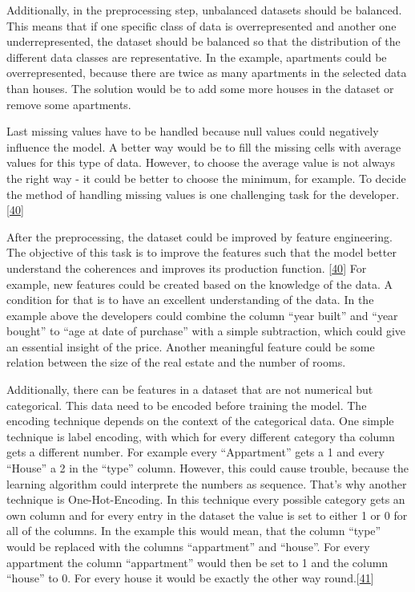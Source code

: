 \documentclass[12pt,english,a4paper,oneside,,tablecaptionabove]{scrbook}
\begin{document}
Additionally, in the preprocessing step, unbalanced datasets should be
balanced. This means that if one specific class of data is
overrepresented and another one underrepresented, the dataset should be
balanced so that the distribution of the different data classes are
representative. In the example, apartments could be overrepresented,
because there are twice as many apartments in the selected data than
houses. The solution would be to add some more houses in the dataset or
remove some apartments.

Last missing values have to be handled because null values could
negatively influence the model. A better way would be to fill the
missing cells with average values for this type of data. However, to
choose the average value is not always the right way - it could be
better to choose the minimum, for example. To decide the method of
handling missing values is one challenging task for the developer.
{[}\protect\hyperlink{ref-article}{40}{]}

After the preprocessing, the dataset could be improved by feature
engineering. The objective of this task is to improve the features such
that the model better understand the coherences and improves its
production function. {[}\protect\hyperlink{ref-article}{40}{]} For
example, new features could be created based on the knowledge of the
data. A condition for that is to have an excellent understanding of the
data. In the example above the developers could combine the column
\enquote{year built} and \enquote{year bought} to \enquote{age at date
of purchase} with a simple subtraction, which could give an essential
insight of the price. Another meaningful feature could be some relation
between the size of the real estate and the number of rooms.

Additionally, there can be features in a dataset that are not numerical
but categorical. This data need to be encoded before training the model.
The encoding technique depends on the context of the categorical data.
One simple technique is label encoding, with which for every different
category tha column gets a different number. For example every
\enquote{Appartment} gets a 1 and every \enquote{House} a 2 in the
\enquote{type} column. However, this could cause trouble, because the
learning algorithm could interprete the numbers as sequence. That's why
another technique is One-Hot-Encoding. In this technique every possible
category gets an own column and for every entry in the dataset the value
is set to either 1 or 0 for all of the columns. In the example this
would mean, that the column \enquote{type} would be replaced with the
columns \enquote{appartment} and \enquote{house}. For every appartment
the column \enquote{appartment} would then be set to 1 and the column
\enquote{house} to 0. For every house it would be exactly the other way
round.{[}\protect\hyperlink{ref-SunnySrinidhi}{41}{]}
\end{document}

